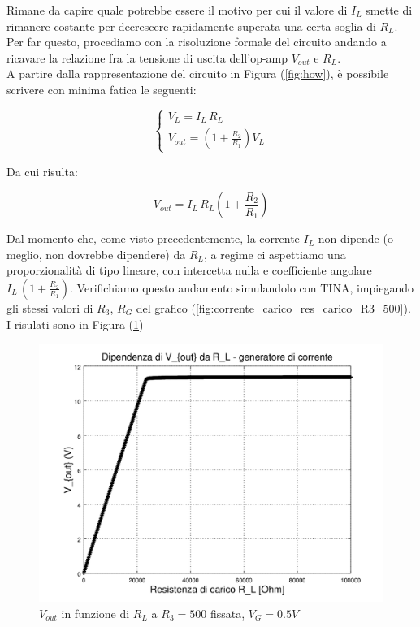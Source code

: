 \documentclass[journal, a4paper]{IEEEtran}
\begin{document}
Rimane da capire quale potrebbe essere il motivo per cui il valore di $I_L$ smette di rimanere costante per decrescere rapidamente superata una certa soglia di $R_L$. Per far questo, procediamo con la risoluzione formale del circuito andando a ricavare la relazione fra la tensione di uscita dell'op-amp $V_{out}$ e $R_L$.\\

A partire dalla rappresentazione del circuito in Figura (\ref{fig:how}), è possibile scrivere con minima fatica le seguenti:

\begin{equation}
\begin{cases}
V_L = I_L \, R_L \\
V_{out} = (1+ \frac{R_2}{R_1})V_L
\end{cases}
\end{equation}

Da cui risulta:

\begin{equation}
V_{out} = I_L \, R_L (1+ \frac{R_2}{R_1})
\end{equation}

Dal momento che, come visto precedentemente, la corrente $I_L$ non dipende (o meglio, non dovrebbe dipendere) da $R_L$, a regime ci aspettiamo una proporzionalità di tipo lineare, con intercetta nulla e coefficiente angolare $ I_L \, (1+ \frac{R_2}{R_1})$. Verifichiamo questo andamento simulandolo con TINA, impiegando gli stessi valori di $R_3$, $R_G$ del grafico (\ref{fig:corrente_carico_res_carico_R3_500}). I risulati sono in Figura (\ref{fig:Vout_R_L_R3_500})

\begin{figure}
\centering
\includegraphics[width=0.7\linewidth]{./Vout_R_L_R3_500}
\caption{$V_{out}$ in funzione di $R_L$ a $R_3 = 500$ fissata, $V_G = 0.5V$}
\label{fig:Vout_R_L_R3_500}
\end{figure}
\end{document}
